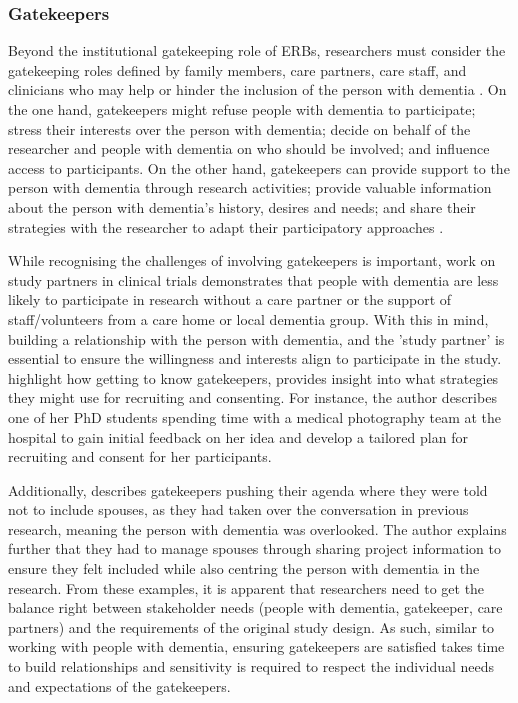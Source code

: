 \subsubsection{Gatekeepers}
Beyond the institutional gatekeeping role of ERBs, researchers must consider the gatekeeping roles defined by family members, care partners, care staff, and clinicians who may help or hinder the inclusion of the person with dementia \cite{ries2020ethical}. On the one hand, gatekeepers might refuse people with dementia to participate; stress their interests over the person with dementia; decide on behalf of the researcher and people with dementia on who should be involved; and influence access to participants. On the other hand, gatekeepers can provide support to the person with dementia through research activities; provide valuable information about the person with dementia's history, desires and needs; and share their strategies with the researcher to adapt their participatory approaches \citep{novek2019safe}.

While recognising the challenges of involving gatekeepers is important, \cite{grill2014facilitating} work on study partners in clinical trials demonstrates that people with dementia are less likely to participate in research without a care partner or the support of staff/volunteers from a care home or local dementia group. With this in mind, building a relationship with the person with dementia, and the 'study partner' is essential to ensure the willingness and interests align to participate in the study. \cite{bartlett2019strategies} highlight how getting to know gatekeepers, provides insight into what strategies they might use for recruiting and consenting. For instance, the author describes one of her PhD students spending time with a medical photography team at the hospital to gain initial feedback on her idea and develop a tailored plan for recruiting and consent for her participants. 

Additionally, \cite{thoft2021journey} describes gatekeepers pushing their agenda where they were told not to include spouses, as they had taken over the conversation in previous research, meaning the person with dementia was overlooked. The author explains further that they had to manage spouses through sharing project information to ensure they felt included while also centring the person with dementia in the research. From these examples, it is apparent that researchers need to get the balance right between stakeholder needs (people with dementia, gatekeeper, care partners) and the requirements of the original study design. As such, similar to working with people with dementia, ensuring gatekeepers are satisfied takes time to build relationships and sensitivity is required to respect the individual needs and expectations of the gatekeepers.

